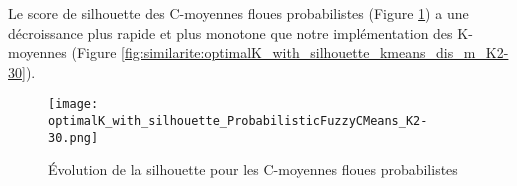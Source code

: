 Le score de silhouette des C-moyennes floues probabilistes (Figure \ref{fig:similarite:optimalK_with_silhouette_ProbabilisticFuzzyCMeans_K2-30}) a une décroissance plus rapide et plus monotone que notre implémentation des K-moyennes (Figure \ref{fig:similarite:optimalK_with_silhouette_kmeans_dis_m_K2-30}).

\begin{figure}[!htb]
	\centering \texttt{[image: optimalK\_with\_silhouette\_ProbabilisticFuzzyCMeans\_K2-30.png]} \hfil
	
	\caption{Évolution de la silhouette pour les C-moyennes floues probabilistes}\label{fig:similarite:optimalK_with_silhouette_ProbabilisticFuzzyCMeans_K2-30}
\end{figure}

